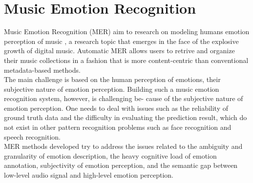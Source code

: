 \section{Music Emotion Recognition}
Music Emotion Recognition (MER) aim to research on modeling humans emotion perception of music \cite{yang2011music}, a research topic that emerges in the face of the explosive growth of digital music.
Automatic MER allows users to retrive and organize their music collections in a fashion that is more content-centric than conventional metadata-based methods.
\\
The main challenge is based on the human perception of emotions, their subjective nature of emotion perception. 
Building such a music emotion recognition system, however, is challenging be- cause of the subjective nature of emotion perception. One needs to deal with issues such as the reliability of ground truth data and the difficulty in evaluating the prediction result, which do not exist in other pattern recognition problems such as face recognition and speech recognition. 
\\
MER methods developed try to address the issues related to the ambiguity and granularity of emotion description, the heavy cognitive load of emotion annotation, subjectivity of emotion perception, and the semantic gap between low-level audio signal and high-level emotion perception.

